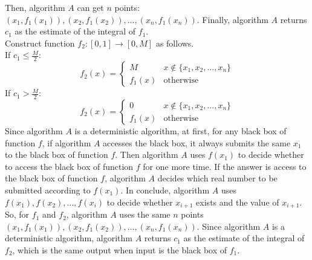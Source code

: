 Then, algorithm $A$ can get $n$ points: $(x_1,f_1(x_1)),(x_2,f_1(x_2)),...,(x_n,f_1(x_n))$.
Finally, algorithm $A$ returns $c_1$ as the estimate of the integral of $f_1$.\\
Construct function $f_2:[0, 1]\rightarrow [0, M ]$ as follows. \\
If $c_1 \le \frac{M}{2}$:
\begin{equation}
   \nonumber  f_2(x)=
    \begin{cases}
    M& x\notin\{x_1,x_2,...,x_n\}\\
    f_1(x)& \text{otherwise}
    \end{cases}
\end{equation}
If $c_1 > \frac{M}{2}$:
\begin{equation}
   \nonumber  f_2(x)=
    \begin{cases}
    0& x\notin\{x_1,x_2,...,x_n\}\\
    f_1(x)& \text{otherwise}
    \end{cases}
\end{equation}
Since algorithm $A$ is a deterministic algorithm, 
at first, 
for any black box of function $f$, if algorithm $A$ accesses the black box,
it always submits the same $x_1$ to the black box of function $f$.
Then algorithm $A$ uses $f(x_1)$ to decide whether to access the black box of function $f$ for one more time.
If the answer is access to the black box of function $f$, algorithm $A$ decides which real number to be submitted according to $f(x_1)$.
In conclude, algorithm $A$ uses $f(x_1), f(x_2),...,f(x_i)$ to decide whether $x_{i+1}$ exists and the value of $x_{i+1}$.
So, for $f_1$ and $f_2$, algorithm $A$ uses the same $n$ points $(x_1,f_1(x_1)),(x_2,f_1(x_2)),...,(x_n,f_1(x_n))$.
Since algorithm $A$ is a deterministic algorithm, 
algorithm $A$ returns $c_1$ as the estimate of the integral of $f_2$, which is the same output when input is the black box of $f_1$.
